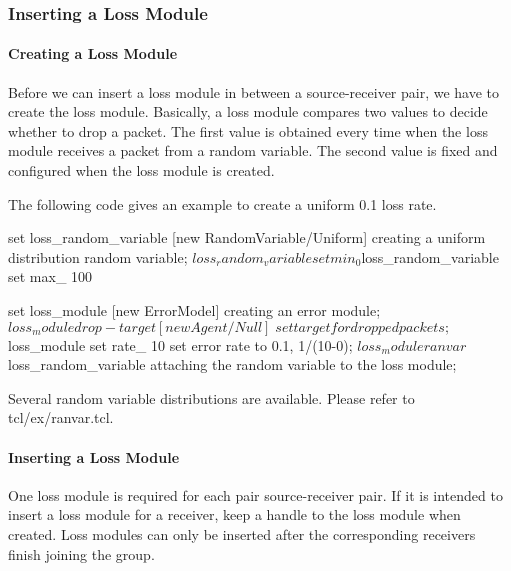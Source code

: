 \documentclass{article}
\begin{document}
\subsubsection{Inserting a Loss Module}
\label{sec:loss-config}
\paragraph{Creating a Loss Module}
Before we can insert a loss module in between a source-receiver pair,
we have to create the loss module.  Basically,
a loss module compares two values to decide whether to drop a packet.
The first value is obtained every time when the loss module receives 
a packet from a random variable.  The second value
is fixed and configured when the loss module is created.

The following code gives an example to create a uniform 
0.1 loss rate.

\begin{program}
set loss_random_variable [new RandomVariable/Uniform] \; creating a uniform distribution random variable;
$loss_random_variable set min_ 0
$loss_random_variable set max_ 100

set loss_module [new ErrorModel]                    \; creating an error module;
$loss_module drop-target [new Agent/Null]           \; set target for dropped packets;
$loss_module set rate_ 10             \; set error rate to 0.1, 1/(10-0);
$loss_module ranvar $loss_random_variable \; attaching the random variable to the loss module;
\end{program}

Several random variable distributions are available.
Please refer to tcl/ex/ranvar.tcl.

\paragraph{Inserting a Loss Module}

One loss module is required for each pair source-receiver pair. If it is
intended to insert a loss module for a receiver, keep a handle to the 
loss module when created.  Loss modules can only be inserted after the
corresponding receivers finish joining the group.

\end{document}
